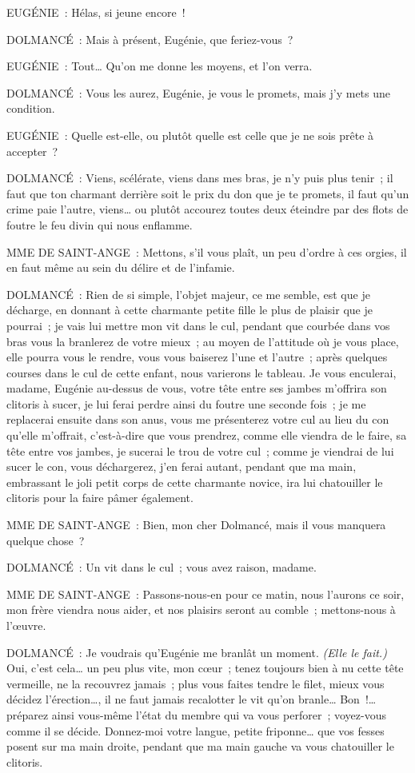 \documentclass[french,twoside]{book} %
\begin{document}
EUGÉNIE : Hélas, si jeune encore !\par
DOLMANCÉ : Mais à présent, Eugénie, que feriez-vous ?\par
EUGÉNIE : Tout… Qu’on me donne les moyens, et l’on verra.\par
DOLMANCÉ : Vous les aurez, Eugénie, je vous le promets, mais j’y mets une condition.\par
EUGÉNIE : Quelle est-elle, ou plutôt quelle est celle que je ne sois prête à accepter ?\par
DOLMANCÉ : Viens, scélérate, viens dans mes bras, je n’y puis plus tenir ; il faut que ton charmant derrière soit le prix du don que je te promets, il faut qu’un crime paie l’autre, viens… ou plutôt accourez toutes deux éteindre par des flots de foutre le feu divin qui nous enflamme.\par
MME DE SAINT-ANGE : Mettons, s’il vous plaît, un peu d’ordre à ces orgies, il en faut même au sein du délire et de l’infamie.\par
DOLMANCÉ : Rien de si simple, l’objet majeur, ce me semble, est que je décharge, en donnant à cette charmante petite fille le plus de plaisir que je pourrai ; je vais lui mettre mon vit dans le cul, pendant que courbée dans vos bras vous la branlerez de votre mieux ; au moyen de l’attitude où je vous place, elle pourra vous le rendre, vous vous baiserez l’une et l’autre ; après quelques courses dans le cul de cette enfant, nous varierons le tableau. Je vous enculerai, madame, Eugénie au-dessus de vous, votre tête entre ses jambes m’offrira son clitoris à sucer, je lui ferai perdre ainsi du foutre une seconde fois ; je me replacerai ensuite dans son anus, vous me présenterez votre cul au lieu du con qu’elle m’offrait, c’est-à-dire que vous prendrez, comme elle viendra de le faire, sa tête entre vos jambes, je sucerai le trou de votre cul ; comme je viendrai de lui sucer le con, vous déchargerez, j’en ferai autant, pendant que ma main, embrassant le joli petit corps de cette charmante novice, ira lui chatouiller le clitoris pour la faire pâmer également.\par
MME DE SAINT-ANGE : Bien, mon cher Dolmancé, mais il vous manquera quelque chose ?\par
DOLMANCÉ : Un vit dans le cul ; vous avez raison, madame.\par
MME DE SAINT-ANGE : Passons-nous-en pour ce matin, nous l’aurons ce soir, mon frère viendra nous aider, et nos plaisirs seront au comble ; mettons-nous à l’œuvre.\par
DOLMANCÉ : Je voudrais qu’Eugénie me branlât un moment. {\itshape (Elle le fait.)} Oui, c’est cela… un peu plus vite, mon cœur ; tenez toujours bien à nu cette tête vermeille, ne la recouvrez jamais ; plus vous faites tendre le filet, mieux vous décidez l’érection…, il ne faut jamais recalotter le vit qu’on branle… Bon !… préparez ainsi vous-même l’état du membre qui va vous perforer ; voyez-vous comme il se décide. Donnez-moi votre langue, petite friponne… que vos fesses posent sur ma main droite, pendant que ma main gauche va vous chatouiller le clitoris.\par
\end{document}
